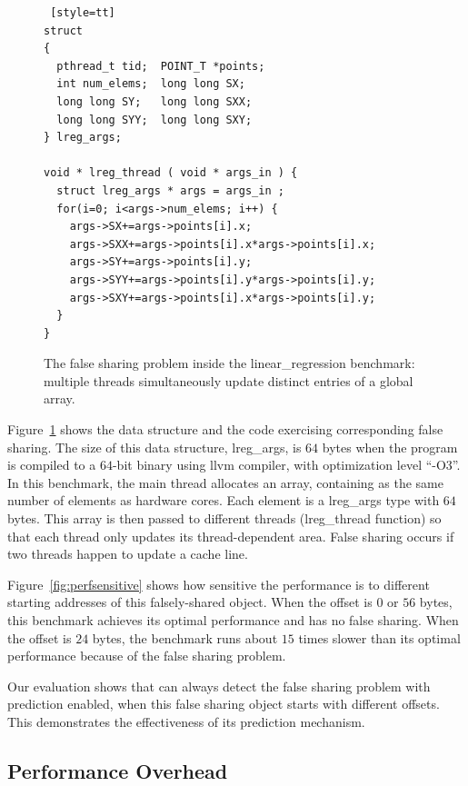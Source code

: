 \begin{figure}
\begin{lstlisting} [style=tt]
struct
{
  pthread_t tid;  POINT_T *points;
  int num_elems;  long long SX;
  long long SY;   long long SXX;
  long long SYY;  long long SXY;
} lreg_args;

void * lreg_thread ( void * args_in ) {
  struct lreg_args * args = args_in ;
  for(i=0; i<args->num_elems; i++) {
    args->SX+=args->points[i].x;
    args->SXX+=args->points[i].x*args->points[i].x;
    args->SY+=args->points[i].y;
    args->SYY+=args->points[i].y*args->points[i].y;
    args->SXY+=args->points[i].x*args->points[i].y;
  }
}
\end{lstlisting}
\caption{The false sharing problem inside the linear\_regression benchmark: multiple threads simultaneously update distinct entries of a global array.
\label{fig:linearregression}}
\end{figure}

Figure~\ref{fig:linearregression} shows the data structure and the code exercising corresponding false sharing. The size of this data structure, lreg\_args, is $64$ bytes 
when the program is compiled to a $64$-bit binary using llvm compiler, with optimization level ``-O3''. In this benchmark, the main thread allocates an array, containing as the same number of elements as hardware cores. Each element is a lreg\_args type with $64$ bytes. This array is then passed to different threads (lreg\_thread function) so that each thread only updates its thread-dependent area. False sharing occurs if two threads happen to update a cache line. 

Figure~\ref{fig:perfsensitive} shows how sensitive the performance is to different starting addresses of this falsely-shared object. When the offset is $0$ or $56$ bytes, this benchmark achieves its optimal performance and has no false sharing. When the offset is $24$ bytes, the benchmark runs about $15$ times slower than its optimal performance because of the false sharing problem.

Our evaluation shows that \Predator{} can always detect the false sharing problem with prediction enabled, when this false  sharing object starts with different offsets. This demonstrates the effectiveness of its prediction mechanism.

\subsection{Performance Overhead}
\label{sec:perfoverhead}


